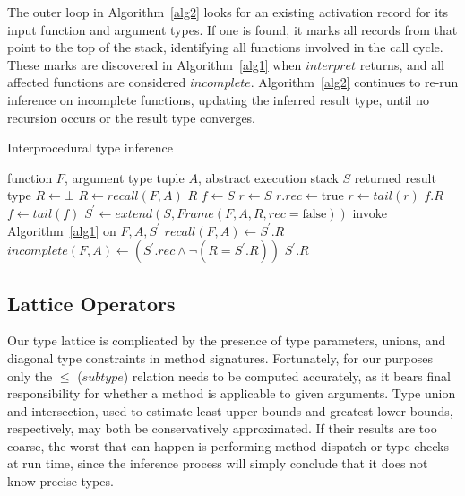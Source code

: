 \documentclass[9pt]{sigplanconf}
\begin{document}
The outer loop in Algorithm~\ref{alg2} looks for an existing activation
record for its input function and argument types. If one is found, it
marks all records from that point to the top of the stack, identifying
all functions involved in the call cycle. These marks
are discovered in Algorithm~\ref{alg1} when $interpret$ returns, and all
affected functions are considered $incomplete$. Algorithm~\ref{alg2}
continues to re-run inference on incomplete functions, updating the
inferred result type, until no recursion occurs or the result type
converges.

\begin{algorithm}
\caption{Interprocedural type inference}
\label{alg2}
\begin{algorithmic}
\REQUIRE function $F$, argument type tuple $A$, abstract execution stack $S$
\ENSURE returned result type
\STATE $R \leftarrow \bot$
 \STATE $R \leftarrow recall(F,A)$
  \RETURN $R$
 \ENDIF
\ENDIF
\STATE $f \leftarrow S$
  \STATE $r \leftarrow S$
   \STATE $r.rec \leftarrow \text{true}$
   \STATE $r \leftarrow tail(r)$
  \ENDWHILE
  \RETURN $f.R$
 \ENDIF
 \STATE $f \leftarrow tail(f)$
\ENDWHILE
\STATE $S^{\prime} \leftarrow extend(S, Frame(F,A,R,rec=\text{false}))$
\STATE invoke Algorithm~\ref{alg1} on $F,A,S^{\prime}$
\STATE $recall(F,A) \leftarrow S^{\prime}.R$
\STATE $incomplete(F,A) \leftarrow (S^{\prime}.rec \land \neg(R=S^{\prime}.R))$
\RETURN $S^{\prime}.R$
\end{algorithmic}
\end{algorithm}


\subsection{Lattice Operators}

Our type lattice is complicated by the presence of type parameters, unions,
and diagonal type constraints in method signatures. Fortunately, for our
purposes only the $\leq$ ($subtype$) relation needs to be computed accurately,
as it bears final responsibility for whether a method is applicable to
given arguments. Type union and intersection, used to estimate
least upper bounds and greatest lower bounds, respectively, may both be
conservatively approximated. If their results are too coarse, the
worst that can happen is performing method dispatch or type checks
at run time, since the inference process will simply conclude that it does
not know precise types.
\end{document}
